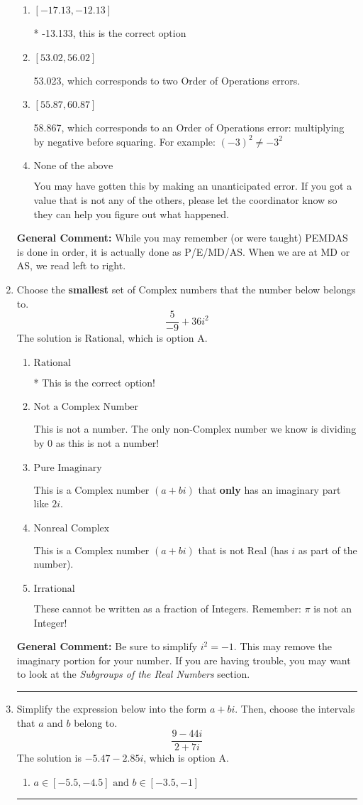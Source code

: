 \documentclass{extbook}[14pt]
\newcommand{\litem}[1]{\item #1

\rule{\textwidth}{0.4pt}}
\begin{document}
\begin{enumerate}
{\begin{enumerate}[label=\Alph*.]
 -18.977, which corresponds to an Order of Operations error: not reading left-to-right for multiplication/division.
\item \( [-17.13, -12.13] \)

* -13.133, this is the correct option
\item \( [53.02, 56.02] \)

 53.023, which corresponds to two Order of Operations errors.
\item \( [55.87, 60.87] \)

 58.867, which corresponds to an Order of Operations error: multiplying by negative before squaring. For example: $(-3)^2 \neq -3^2$
\item \( \text{None of the above} \)

 You may have gotten this by making an unanticipated error. If you got a value that is not any of the others, please let the coordinator know so they can help you figure out what happened.
\end{enumerate}

\textbf{General Comment:} While you may remember (or were taught) PEMDAS is done in order, it is actually done as P/E/MD/AS. When we are at MD or AS, we read left to right.
}
\litem{
Choose the \textbf{smallest} set of Complex numbers that the number below belongs to.
\[ \frac{5}{-9}+36i^2 \]The solution is \( \text{Rational} \), which is option A.\begin{enumerate}[label=\Alph*.]
\item \( \text{Rational} \)

* This is the correct option!
\item \( \text{Not a Complex Number} \)

This is not a number. The only non-Complex number we know is dividing by 0 as this is not a number!
\item \( \text{Pure Imaginary} \)

This is a Complex number $(a+bi)$ that \textbf{only} has an imaginary part like $2i$.
\item \( \text{Nonreal Complex} \)

This is a Complex number $(a+bi)$ that is not Real (has $i$ as part of the number).
\item \( \text{Irrational} \)

These cannot be written as a fraction of Integers. Remember: $\pi$ is not an Integer!
\end{enumerate}

\textbf{General Comment:} Be sure to simplify $i^2 = -1$. This may remove the imaginary portion for your number. If you are having trouble, you may want to look at the \textit{Subgroups of the Real Numbers} section.
}
\litem{
Simplify the expression below into the form $a+bi$. Then, choose the intervals that $a$ and $b$ belong to.
\[ \frac{9 - 44 i}{2 + 7 i} \]The solution is \( -5.47  - 2.85 i \), which is option A.\begin{enumerate}[label=\Alph*.]
\item \( a \in [-5.5, -4.5] \text{ and } b \in [-3.5, -1] \)


\end{enumerate}}
\end{enumerate}
\end{document}
